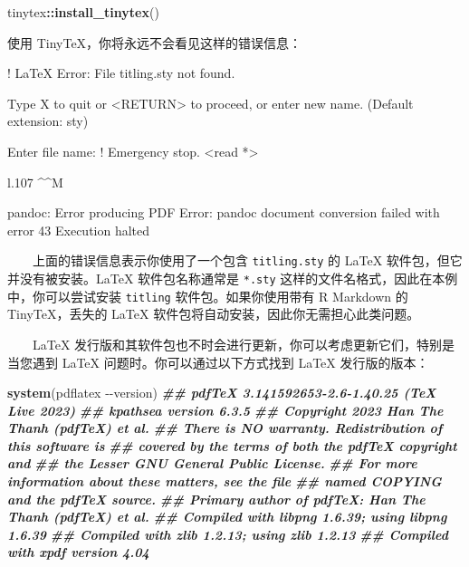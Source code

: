\documentclass[
  12pt,
]{krantz}
\newenvironment{Shaded}{\begin{snugshade}}{\end{snugshade}}
\newcommand{\DocumentationTok}[1]{\textcolor[rgb]{0.56,0.35,0.01}{\textbf{\textit{#1}}}}
\newcommand{\FunctionTok}[1]{\textcolor[rgb]{0.13,0.29,0.53}{\textbf{#1}}}
\newcommand{\NormalTok}[1]{#1}
\newcommand{\SpecialCharTok}[1]{\textcolor[rgb]{0.81,0.36,0.00}{\textbf{#1}}}
\newcommand{\StringTok}[1]{\textcolor[rgb]{0.31,0.60,0.02}{#1}}
\theoremstyle{definition}
\theoremstyle{definition}
\theoremstyle{definition}
\theoremstyle{definition}
\theoremstyle{remark}
\begin{document}
\begin{Shaded}
\begin{Highlighting}[]
\NormalTok{tinytex}\SpecialCharTok{::}\FunctionTok{install\_tinytex}\NormalTok{()}
\end{Highlighting}
\end{Shaded}

使用 TinyTeX，你将永远不会看见这样的错误信息：

\begin{Shaded}
\begin{Highlighting}[]
\NormalTok{! LaTeX Error: File \textasciigrave{}titling.sty\textquotesingle{} not found.}

\NormalTok{Type X to quit or \textless{}RETURN\textgreater{} to proceed,}
\NormalTok{or enter new name. (Default extension: sty)}

\NormalTok{Enter file name: }
\NormalTok{! Emergency stop.}
\NormalTok{\textless{}read *\textgreater{} }
         
\NormalTok{l.107 \^{}\^{}M}

\NormalTok{pandoc: Error producing PDF}
\NormalTok{Error: pandoc document conversion failed with error 43}
\NormalTok{Execution halted}
\end{Highlighting}
\end{Shaded}

  上面的错误信息表示你使用了一个包含 \texttt{titling.sty} 的 LaTeX 软件包，但它并没有被安装。LaTeX 软件包名称通常是 \texttt{*.sty} 这样的文件名格式，因此在本例中，你可以尝试安装 \texttt{titling} 软件包。如果你使用带有 R Markdown 的 TinyTeX，丢失的 LaTeX 软件包将自动安装，因此你无需担心此类问题。

  LaTeX 发行版和其软件包也不时会进行更新，你可以考虑更新它们，特别是当您遇到 LaTeX 问题时。你可以通过以下方式找到 LaTeX 发行版的版本：

\begin{Shaded}
\begin{Highlighting}[]
\FunctionTok{system}\NormalTok{(}\StringTok{\textquotesingle{}pdflatex {-}{-}version\textquotesingle{}}\NormalTok{)}
\DocumentationTok{\#\#  pdfTeX 3.141592653{-}2.6{-}1.40.25 (TeX Live 2023)}
\DocumentationTok{\#\#  kpathsea version 6.3.5}
\DocumentationTok{\#\#  Copyright 2023 Han The Thanh (pdfTeX) et al.}
\DocumentationTok{\#\#  There is NO warranty.  Redistribution of this software is}
\DocumentationTok{\#\#  covered by the terms of both the pdfTeX copyright and}
\DocumentationTok{\#\#  the Lesser GNU General Public License.}
\DocumentationTok{\#\#  For more information about these matters, see the file}
\DocumentationTok{\#\#  named COPYING and the pdfTeX source.}
\DocumentationTok{\#\#  Primary author of pdfTeX: Han The Thanh (pdfTeX) et al.}
\DocumentationTok{\#\#  Compiled with libpng 1.6.39; using libpng 1.6.39}
\DocumentationTok{\#\#  Compiled with zlib 1.2.13; using zlib 1.2.13}
\DocumentationTok{\#\#  Compiled with xpdf version 4.04}
\end{Highlighting}
\end{Shaded}
\end{document}
